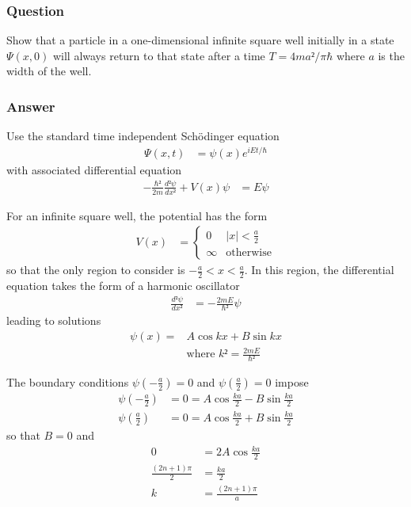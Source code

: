 \subsubsection{Question}

Show that a particle in a one-dimensional infinite square well initially in a
state $Ψ(x,0)$ will always return to that state after a time $T = 4ma²/π\hbar$
where $a$ is the width of the well.

\subsubsection{Answer}
Use the standard time independent Schödinger equation
\begin{align*}
	Ψ(x,t) &= ψ(x) e^{iEt/\hbar}
\end{align*}
with associated differential equation
\begin{align*}
	-\frac{\hbar²}{2m} \frac{d²ψ}{dx²} + V(x)ψ &= Eψ
\end{align*}

For an infinite square well, the potential has the form
\begin{align*}
	V(x) &=
		\begin{cases}
			0	&	|x| < \frac{a}{2} \\
			∞	&	\text{otherwise}
		\end{cases}
\end{align*}
so that the only region to consider is $-\frac{a}{2} < x < \frac{a}{2}$. In this
region, the differential equation takes the form of a harmonic oscillator
\begin{align*}
	\frac{d²ψ}{dx²} &= -\frac{2mE}{\hbar²}ψ
\end{align*}
leading to solutions
\begin{align*}
	ψ(x) ={}& A\cos kx + B\sin kx \\
	{}& \text{where } k² = \frac{2mE}{\hbar²}
\end{align*}

The boundary conditions $ψ(-\frac{a}{2}) = 0$ and $ψ(\frac{a}{2}) = 0$ impose
\begin{align*}
	ψ\left(-\frac{a}{2}\right) &= 0 = A\cos \frac{ka}{2} - B\sin \frac{ka}{2} \\
	ψ\left(\frac{a}{2}\right)  &= 0 = A\cos \frac{ka}{2} + B\sin \frac{ka}{2}
\end{align*}
so that $B = 0$ and
\begin{align*}
	0 &= 2A \cos \frac{ka}{2} \\
	\frac{(2n+1)π}{2} &= \frac{ka}{2} \\
	k &= \frac{(2n+1)π}{a}
\end{align*}


